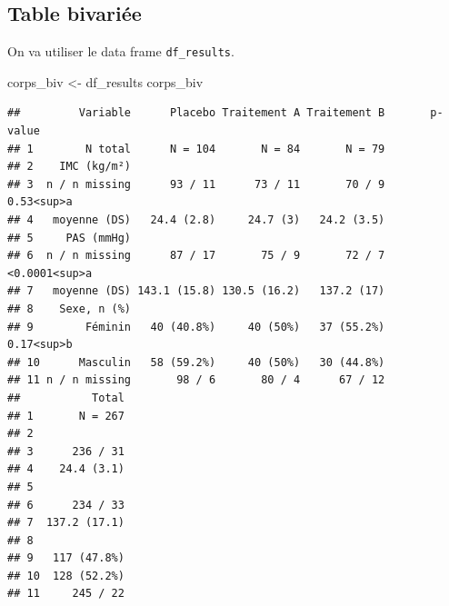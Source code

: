 \documentclass[
]{book}
\newenvironment{Shaded}{\begin{snugshade}}{\end{snugshade}}
\newcommand{\NormalTok}[1]{#1}
\newcommand{\OtherTok}[1]{\textcolor[rgb]{0.56,0.35,0.01}{#1}}
\begin{document}
\subsection{Table bivariée}\label{table-bivariuxe9e}

On va utiliser le data frame \texttt{df\_results}.

\begin{Shaded}
\begin{Highlighting}[]
\NormalTok{corps\_biv }\OtherTok{\textless{}{-}}\NormalTok{ df\_results}
\NormalTok{corps\_biv}
\end{Highlighting}
\end{Shaded}

\begin{verbatim}
##         Variable      Placebo Traitement A Traitement B       p-value
## 1        N total      N = 104       N = 84       N = 79              
## 2    IMC (kg/m²)                                                     
## 3  n / n missing      93 / 11      73 / 11       70 / 9    0.53<sup>a
## 4   moyenne (DS)   24.4 (2.8)     24.7 (3)   24.2 (3.5)              
## 5     PAS (mmHg)                                                     
## 6  n / n missing      87 / 17       75 / 9       72 / 7 <0.0001<sup>a
## 7   moyenne (DS) 143.1 (15.8) 130.5 (16.2)   137.2 (17)              
## 8    Sexe, n (%)                                                     
## 9        Féminin   40 (40.8%)     40 (50%)   37 (55.2%)    0.17<sup>b
## 10      Masculin   58 (59.2%)     40 (50%)   30 (44.8%)              
## 11 n / n missing       98 / 6       80 / 4      67 / 12              
##           Total
## 1       N = 267
## 2              
## 3      236 / 31
## 4    24.4 (3.1)
## 5              
## 6      234 / 33
## 7  137.2 (17.1)
## 8              
## 9   117 (47.8%)
## 10  128 (52.2%)
## 11     245 / 22
\end{verbatim}
\end{document}

